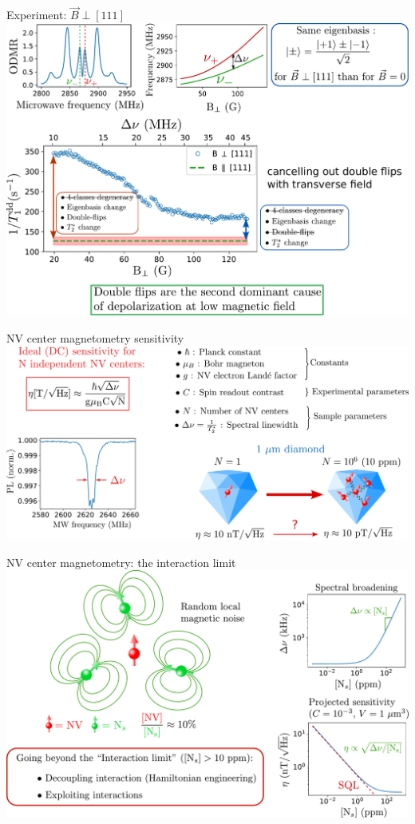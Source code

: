 \documentclass{beamer}
\begin{document}
\begin{frame}{Experiment: $\vec B \perp [111]$}
\centering
\includegraphics[width=\textwidth,height=0.85\textheight,keepaspectratio]{slide_champs_transverse}
\end{frame}

\begin{frame}{NV center magnetometry sensitivity}
\centering
\includegraphics[width=\textwidth,height=0.85\textheight,keepaspectratio]{Slide_NV_limite_sensi}
\end{frame}

\begin{frame}{NV center magnetometry: the interaction limit}
\centering
\includegraphics[width=\textwidth,height=0.85\textheight,keepaspectratio]{Slide_interaction_limit}
\end{frame}
\end{document}
